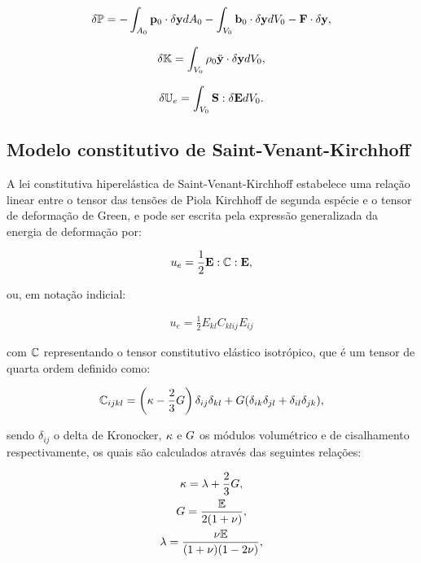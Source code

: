 \documentclass[tese_patricia]{subfiles}
\begin{document}
\begin{align}
	 \delta\mathbb{P} = - \int_{A_{0}} \mathbf{p}_{0} \cdot \delta\mathbf{y} dA_{0} - \int_{V_{0}}  \mathbf{b}_0 \cdot \delta\mathbf{y} dV_{0} - \mathbf{F} \cdot \delta\mathbf{y},
\end{align}


\begin{align}
	\delta\mathbb{K} = \int_{V_{0}} \rho_{0} \ddot{\mathbf{y}} \cdot \delta\mathbf{y} dV_{0},
\end{align}

\begin{align}
	 \delta\mathbb{U}_e = \int_{V_{0}} \mathbf{S} : \delta\mathbf{E} dV_{0}.
\end{align}

\subsection{Modelo constitutivo de Saint-Venant-Kirchhoff}

A lei constitutiva hiperelástica de Saint-Venant-Kirchhoff estabelece uma relação linear entre o tensor das tensões de Piola Kirchhoff de segunda espécie e o tensor de deformação de Green, e pode ser escrita pela expressão generalizada da energia de deformação por:

\begin{align}
u_{e} = \frac{1}{2} \mathbf{E} : \mathbb{C} : \mathbf{E},
\end{align}

\noindent ou, em notação indicial:

\begin{align}
u_{e} = \frac{1}{2} E_{kl} C_{klij} E_{ij}
\end{align}


\noindent com $\mathbb{C}$ representando o tensor constitutivo elástico isotrópico, que é um tensor de quarta ordem definido como:

\begin{gather}
\mathbb{C}_{ijkl}=\left(\kappa - \frac{2}{3}G \right)\delta_{ij}\delta_{kl} + G(\delta_{ik}\delta_{jl}+\delta_{il}\delta_{jk}),
\end{gather}

\noindent sendo $\delta_{ij}$ o delta de Kronocker, $\kappa$ e $G$ os módulos volumétrico e de cisalhamento respectivamente, os quais são calculados através das seguintes relações:

\begin{gather}
\kappa=\lambda+\frac{2}{3}G,\\
G=\frac{\mathbb{E}}{2(1+\nu)},\\
\lambda=\frac{\nu \mathbb{E}}{(1+\nu)(1-2\nu)},
\end{gather}
\end{document}
